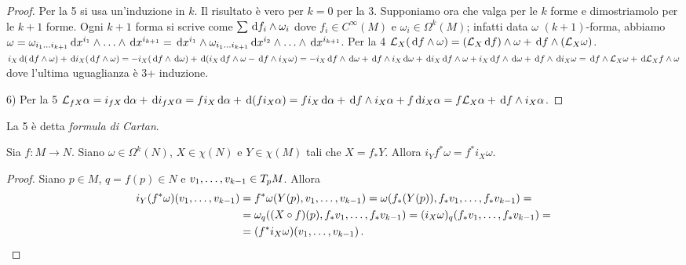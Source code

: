 \begin{proof}
	Per la 5 si usa un'induzione in $k$. Il risultato è vero per $k=0$ per la 3. Supponiamo ora che valga per le $k$ forme e dimostriamolo per le $k+1$ forme. Ogni $k+1$ forma si scrive come $\sum \de f_i \wedge \omega_i$ dove $f_i \in C^\infty(M)$ e $\omega_i\in\Omega^k(M)$; infatti data $\omega$ $(k+1)$-forma, abbiamo
	$\omega = \omega_{\seqb i{k+1}{}} \de x^{i_1} \wedge \ldots \wedge \de x^{i_{k+1}} = \de x^{i_1} \wedge \omega_{\seqb i{k+1}{}} \de x^{i_2} \wedge \ldots \wedge \de x^{i_{k+1}}$.
	Per la 4 $\Lie_X(\de f\wedge\omega) = (\Lie_X\de f)\wedge \omega + \de f \wedge (\Lie_X\omega)$.
	$i_X\de (\de f\wedge \omega) + \de i_X(\de f \wedge \omega) = -i_X(\de f\wedge \de \omega) + \de (i_X\de f \wedge \omega - \de f \wedge i_X\omega) =
	-i_X\de f\wedge \de \omega + \de f\wedge i_X \de \omega + \de i_X \de f \wedge \omega + i_X \de f \wedge \de \omega + \de f \wedge \de i_X \omega
	= \de f \wedge \Lie_X\omega + \de \Lie_Xf \wedge \omega$
	dove l'ultima uguaglianza è 3+ induzione.
	
	6) Per la 5 $\Lie_{fX}\alpha = i_{fX} \de \alpha + \de i_{fX} \alpha = f i_X \de \alpha + \de (fi_X\alpha) = f i_X\de \alpha + \de f \wedge i_X\alpha + f \de i_X\alpha = f\Lie_X \alpha + \de f \wedge i_X\alpha$.
\end{proof}

La 5 è detta \emph{formula di Cartan}.

\begin{proposition}
	Sia $f:M\to N$. Siano $\omega \in \Omega^k(N)$, $X \in \chi(N)$ e $Y \in \chi(M)$ tali che $X = f_*Y$. Allora $i_Yf^*\omega = f^* i_X\omega$.
\end{proposition}
\begin{proof}
	Siano $p\in M$, $q=f(p)\in N$ e $\seqb v{k-1}, \in T_pM$. Allora
	\begin{align*}
		i_Y(f^*\omega)(\seqb v{k-1},) &= f^* \omega (Y(p), \seqb v{k-1},) = \omega (f_*(Y(p)), f_*v_1,\ldots, f_*v_{k-1}) = \\
		&= \omega_q((X\circ f)(p),f_*v_1,\ldots, f_*v_{k-1}) = (i_X\omega)_q (f_*v_1,\ldots, f_*v_{k-1}) =\\
		& =(f^*i_X\omega)(\seqb v{k-1},) \punto 
	\end{align*}
\end{proof}


